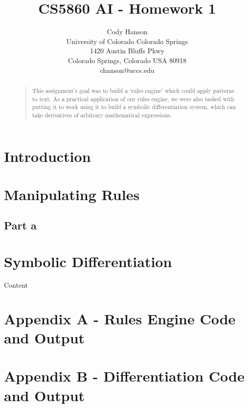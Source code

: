 \documentclass[letterpaper]{article}
\begin{document}
\title{CS5860 AI - Homework 1}
\author{Cody Hanson\\
University of Colorado Colorado Springs\\
1420 Austin Bluffs Pkwy\\
Colorado Springs, Colorado USA 80918\\
chanson@uccs.edu}
\maketitle
\begin{abstract}
\begin{quote}
This assignment's goal was to build a `rules engine' which could apply patterns to text.
As a practical application of our rules engine, we were also tasked with putting it to work using it
to build a symbolic differentiation system, which can take derivatives of arbitrary mathematical expressions.
\end{quote}
\end{abstract}

\section{Introduction}

\section{Manipulating Rules}

\subsection{Part a}

\section{Symbolic Differentiation}

Content

\onecolumn

\newpage
\section{Appendix A - Rules Engine Code and Output}








\newpage
\section{Appendix B - Differentiation Code and Output}






\end{document}
